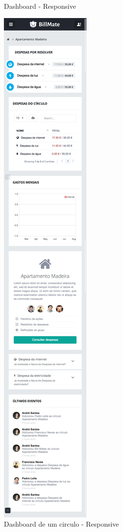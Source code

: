 \begin{figure}[H]
{\caption{Dashboard - Responsive}
}
{
\includegraphics[width=.5\textwidth]{images/andre/circler}
\caption{Dashboard de um circulo - Responsive }
}
\end{figure}

